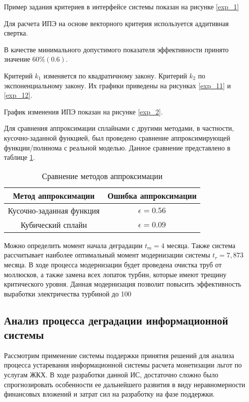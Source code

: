 Пример задания критериев в интерфейсе системы показан на рисунке \ref{exp_1}


Для расчета ИПЭ на основе векторного критерия используется аддитивная свертка.

В качестве минимального допустимого показателя эффективности принято значение $60\% (0.6)$.

Критерий $k_1$ изменяется по квадратичному закону. Критерий $k_2$ по экспоненциальному закону. 
Их графики приведены на рисунках \ref{exp_11} и \ref{exp_12}.


График изменения ИПЭ показан на рисунке \ref{exp_2}.


Для сравнения аппроксимации сплайнами с другими методами, в частности, кусочно-заданной функцией, был проведено сравнение аппроксимирующей функции/полинома с реальной моделью.
Данное сравнение представлено в таблице \ref{table:compare}.
\begin{table}[H]
    \caption{Сравнение методов аппроксимации}
    \centering 
    \label{table:compare}
    \begin{tabular}{|c|c|}
        \hline
        Метод аппроксимации  & Ошибка аппроксимации  \\
        \hline
        Кусочно-заданная функция & $\epsilon=0.56$ \\
        \hline
        Кубический сплайн & $\epsilon=0.09$ \\
        \hline
    \end{tabular}
    \end{table}

Можно определить момент начала деградации $t_m=4$ месяца. 
Также система рассчитывает наиболее оптимальный момент модернизации системы $t_r=7,873$ месяца.
В ходе процесса модернизации будет проведена очистка труб от моллюсков, а также замена всех лопаток турбин, которые имеют трещину критического уровня.
Данная модернизация позволит повысить эффективность выработки электричества турбиной до 100%

\subsection{Анализ процесса деградации информационной системы}
Рассмотрим применение системы поддержки принятия решений для анализа процесса устаревания информационной системы расчета монетизации льгот по услугам ЖКХ.
В ходе разработки данной ИС, достаточно сложно было спрогнозировать особенности ее дальнейшего развития в виду 
неравномерности финансовых вложений и затрат сил на разработку на фазе поддержки.

